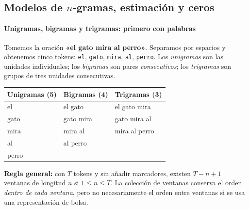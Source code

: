 \subsection{Modelos de $n$-gramas, estimación y ceros}\label{s01:cap:ngram}

\paragraph{Unigramas, bigramas y trigramas: primero con palabras}
Tomemos la oración \textbf{«el gato mira al perro»}. Separamos por espacios y obtenemos cinco tokens: \texttt{el}, \texttt{gato}, \texttt{mira}, \texttt{al}, \texttt{perro}. Los \emph{unigramas} son las unidades individuales; los \emph{bigramas} son pares \emph{consecutivos}; los \emph{trigramas} son grupos de tres unidades consecutivas.
\begin{center}
\end{center}
\begin{center}
\begin{tabular}{lll}\toprule
Unigramas (5) & Bigramas (4) & Trigramas (3)\\\midrule
el & el gato & el gato mira\\
gato & gato mira & gato mira al\\
mira & mira al & mira al perro\\
al & al perro & \\
perro & & \\\bottomrule
\end{tabular}
\end{center}
\noindent\textbf{Regla general:} con $T$ tokens y sin añadir marcadores, existen $T-n+1$ ventanas de longitud $n$ si $1\le n\le T$. La colección de ventanas conserva el orden \emph{dentro de cada ventana}, pero no necesariamente el orden entre ventanas si se usa una representación de bolsa.

